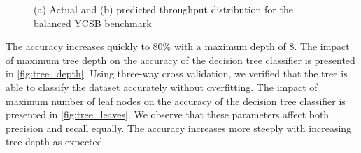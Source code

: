 \begin{figure}
\centering
{}

\caption{(a) Actual and (b) predicted throughput distribution for the
  balanced YCSB benchmark}
\label{fig:throughput_ycsb_balanced}
\end{figure}


The accuracy increases quickly to $80\%$ with a maximum depth of $8$. The impact
of maximum tree depth on the accuracy of the decision tree classifier
is presented in \cref{fig:tree_depth}. Using three-way cross validation,
we verified that the tree is able to classify the dataset accurately
without overfitting.
The impact of maximum number of leaf nodes on the accuracy of the
decision tree classifier is presented in \cref{fig:tree_leaves}.
We observe that these parameters affect both precision and recall
equally. The accuracy increases more steeply with increasing tree
depth as expected.

